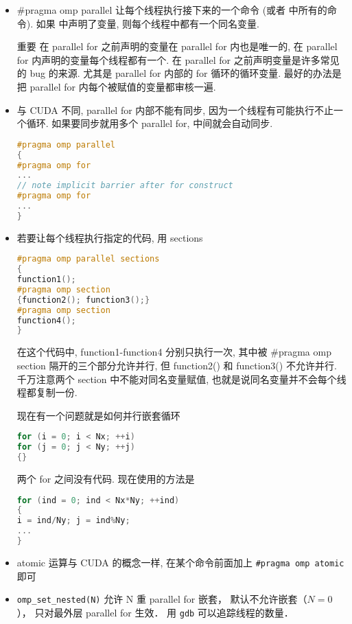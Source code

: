 \begin{itemize}
\item #pragma omp parallel 让每个线程执行接下来的一个命令 (或者 {} 中所有的命令). 如果 {} 中声明了变量, 则每个线程中都有一个同名变量.
\item [重要] 在 parallel for 之前声明的变量在 parallel for 内也是唯一的, 在 parallel for 内声明的变量每个线程都有一个. 在 parallel for 之前声明变量是许多常见的 bug 的来源. 尤其是 parallel for 内部的 for 循环的循环变量. 最好的办法是把 parallel for 内每个被赋值的变量都审核一遍.
\item 与 CUDA 不同, parallel for 内部不能有同步, 因为一个线程有可能执行不止一个循环. 如果要同步就用多个 parallel for, 中间就会自动同步.
\begin{lstlisting}[language=cpp]
#pragma omp parallel
{
#pragma omp for
...
// note implicit barrier after for construct
#pragma omp for
...
}
\end{lstlisting}
\item 若要让每个线程执行指定的代码, 用 sections
\begin{lstlisting}[language=cpp]
#pragma omp parallel sections
{
function1();
#pragma omp section
{function2(); function3();}
#pragma omp section
function4();
}
\end{lstlisting}
在这个代码中, function1-function4 分别只执行一次, 其中被 #pragma omp section 隔开的三个部分允许并行, 但 function2() 和 function3() 不允许并行. 千万注意两个 section 中不能对同名变量赋值, 也就是说同名变量并不会每个线程都复制一份.

现在有一个问题就是如何并行嵌套循环
\begin{lstlisting}[language=cpp]
for (i = 0; i < Nx; ++i)
for (j = 0; j < Ny; ++j)
{}
\end{lstlisting}
两个 for 之间没有代码. 现在使用的方法是
\begin{lstlisting}[language=cpp]
for (ind = 0; ind < Nx*Ny; ++ind)
{
i = ind/Ny; j = ind%Ny;
...
}
\end{lstlisting}
\item atomic 运算与 CUDA 的概念一样, 在某个命令前面加上 \verb|#pragma omp atomic| 即可
\item \verb|omp_set_nested(N)| 允许 N 重 parallel for 嵌套， 默认不允许嵌套（$N=0$）， 只对最外层 parallel for 生效． 用 \verb|gdb| 可以追踪线程的数量．
\end{itemize}
